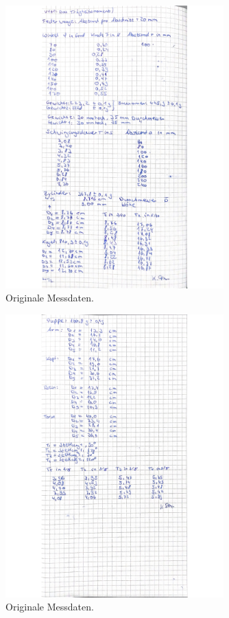 \newpage

\begin{figure}[H]
  \centering
  \includegraphics[width=0.75\textwidth]{Bilder/daten1.jpg}
  \caption{Originale Messdaten.}
  \label{fig:daten1}
\end{figure}

\begin{figure}[H]
  \centering
  \includegraphics[width=0.75\textwidth]{Bilder/daten2.jpg}
  \caption{Originale Messdaten.}
  \label{fig:daten2}
\end{figure}